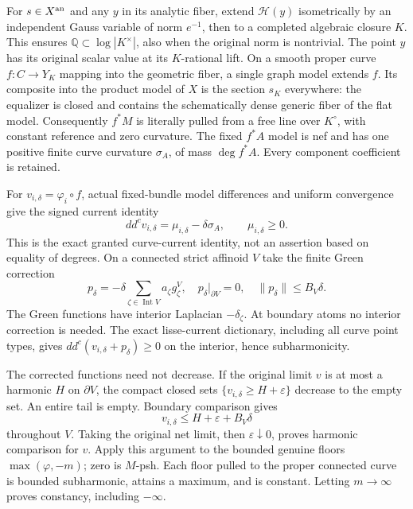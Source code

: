 \documentclass[
  10pt,
]{article}
\begin{document}
For \(s\in X^{\rm an}\) and any \(y\) in its analytic fiber, extend
\(\mathcal H(y)\) isometrically by an independent Gauss variable of norm
\(e^{-1}\), then to a completed algebraic closure \(K\). This ensures
\(\mathbb Q\subset\log|K^\times|\), also when the original norm is
nontrivial. The point \(y\) has its original scalar value at its
\(K\)-rational lift. On a smooth proper curve \(f:C\to Y_K\) mapping
into the geometric fiber, a single graph model extends \(f\). Its
composite into the product model of \(X\) is the section \(s_K\)
everywhere: the equalizer is closed and contains the schematically dense
generic fiber of the flat model. Consequently \(f^*M\) is literally
pulled from a free line over \(K^\circ\), with constant reference and
zero curvature. The fixed \(f^*A\) model is nef and has one positive
finite curve curvature \(\sigma_A\), of mass \(\deg f^*A\). Every
component coefficient is retained.

For \(v_{i,\delta}=\varphi_i\circ f\), actual fixed-bundle model
differences and uniform convergence give the signed current identity
\[dd^c v_{i,\delta}=\mu_{i,\delta}-\delta\sigma_A,\qquad \mu_{i,\delta}\ge0.\]
This is the exact granted curve-current identity, not an assertion based
on equality of degrees. On a connected strict affinoid \(V\) take the
finite Green correction
\[p_\delta=-\delta\sum_{\zeta\in\operatorname{Int}V}a_\zeta g_\zeta^V,
 \quad p_\delta|_{\partial V}=0,\quad \|p_\delta\|\le B_V\delta.\] The
Green functions have interior Laplacian \(-\delta_\zeta\). At boundary
atoms no interior correction is needed. The exact lisse-current
dictionary, including all curve point types, gives
\(dd^c(v_{i,\delta}+p_\delta)\ge0\) on the interior, hence
subharmonicity.

The corrected functions need not decrease. If the original limit \(v\)
is at most a harmonic \(H\) on \(\partial V\), the compact closed sets
\(\{v_{i,\delta}\ge H+\varepsilon\}\) decrease to the empty set. An
entire tail is empty. Boundary comparison gives
\[v_{i,\delta}\le H+\varepsilon+B_V\delta\] throughout \(V\). Taking the
original net limit, then \(\varepsilon\downarrow0\), proves harmonic
comparison for \(v\). Apply this argument to the bounded genuine floors
\(\max(\varphi,-m)\); zero is \(M\)-psh. Each floor pulled to the proper
connected curve is bounded subharmonic, attains a maximum, and is
constant. Letting \(m\to\infty\) proves constancy, including
\(-\infty\).
\end{document}
